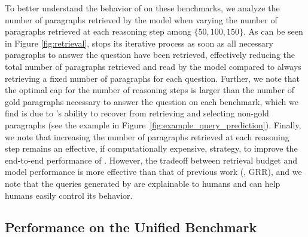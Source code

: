 To better understand the behavior of \irrr{} on these benchmarks, we analyze the number of paragraphs retrieved by the model when varying the number of paragraphs retrieved at each reasoning step among $\{50, 100, 150\}$.
As can be seen in Figure \ref{fig:retrieval}, \irrr{} stops its iterative process as soon as all necessary paragraphs to answer the question have been retrieved, effectively reducing the total number of paragraphs retrieved and read by the model compared to always retrieving a fixed number of paragraphs for each question.
Further, we note that the optimal cap for the number of reasoning steps is larger than the number of gold paragraphs necessary to answer the question on each benchmark, which we find is due to \irrr{}'s ability to recover from retrieving and selecting non-gold paragraphs (see the example in Figure~\ref{fig:example_query_prediction}).
Finally, we note that increasing the number of paragraphs retrieved at each reasoning step remains an effective, if computationally expensive, strategy, to improve the end-to-end performance of \irrr{}.
However, the tradeoff between retrieval budget and model performance is more effective than that of previous work (\eg, GRR), and we note that the queries generated by \irrr{} are explainable to humans and can help humans easily control its behavior.

\subsection{Performance on the Unified Benchmark}

\begin{table}
\small
\centering
    \caption{End-to-end question answering performance of \irrr{} on the unified benchmark, evaluated on the 2020 copy of Wikipedia.
    These results are not directly comparable with those in Tables \ref{tab:benchmark_results_squad} and \ref{tab:benchmark_results_hotpot_3hop} because the set of questions and Wikipedia documents differ.}
    \label{tab:main_results}
\end{table}

